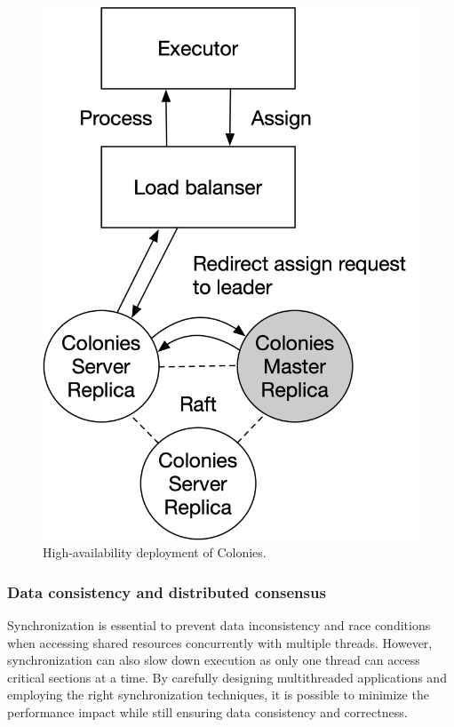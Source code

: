 \documentclass{article}
\begin{document}
\begin{figure}[h]
	\centering
    \includegraphics[scale=0.5]{raft.png}
	\caption{High-availability deployment of Colonies.}
	\label{fig:ha_deployment}
\end{figure}

\subsubsection{Data consistency and distributed consensus}
Synchronization is essential to prevent data inconsistency and race conditions when accessing shared resources concurrently with multiple threads. However, synchronization can also slow down execution as only one thread can access critical sections at a time. By carefully designing multithreaded applications and employing the right synchronization techniques, it is possible to minimize the performance impact while still ensuring data consistency and correctness.  
\end{document}
